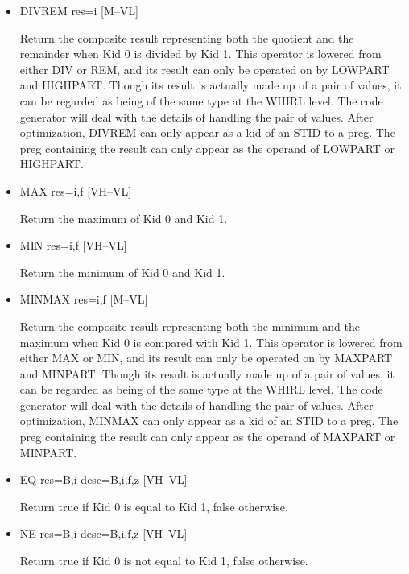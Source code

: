 \begin{itemize}
\item
{}%
DIVREM res=i \hfill [M--VL]

Return the composite result representing both the quotient and the
remainder when Kid 0 is divided by Kid 1. This operator is lowered
from either
%
DIV or
%
REM, and its result can only be operated on by
%
LOWPART and
%
HIGHPART. Though its result is actually made up of a pair of
values, it can be regarded as being of the same type at the WHIRL
level. The code generator will deal with the details of handling the pair of
values. After optimization,
%
DIVREM can only appear as a kid of an
%
STID to a preg. The preg
containing the result can only appear as the operand of
%
LOWPART or
%
HIGHPART.

\item
{}%
MAX res=i,f \hfill [VH--VL]

Return the maximum of Kid 0 and Kid 1.

\item
{}%
MIN res=i,f \hfill [VH--VL]

Return the minimum of Kid 0 and Kid 1.

\item
{}%
MINMAX res=i,f \hfill [M--VL]

Return the composite result representing both the minimum and the
maximum when Kid 0 is compared with Kid 1. This operator is lowered
from either
%
MAX or
%
MIN, and its result can only be operated on by
%
%
MAXPART and
%
%
MINPART. Though its result is actually made up of a pair of values,
it can be regarded as being of the same type at the WHIRL level.
The code
generator will deal with the details of handling the pair of values.
After optimization,
%
MINMAX can only appear as a kid of an
%
STID to a preg. The
preg containing the result can only appear as the operand of
%
MAXPART
or
%
MINPART.

%
\item  EQ res=B,i desc=B,i,f,z \hfill [VH--VL]

Return true if Kid 0 is equal to Kid 1, false otherwise.

%
\item  NE res=B,i desc=B,i,f,z \hfill [VH--VL]

Return true if Kid 0 is not equal to Kid 1, false otherwise.


\end{itemize}
